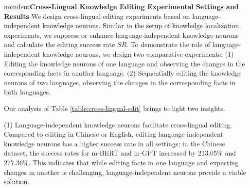 \documentclass[]{article}
\newcommand{\vpara}[1]{noindent\textbf{#1 }}%
\begin{document}
\vpara{Cross-Lingual Knowledge Editing Experimental Settings and Results}
We design cross-lingual editing experiments based on language-independent knowledge neurons. Similar to the setup of knowledge localization experiments, we suppress or enhance language-independent knowledge neurons and calculate the editing success rate \( SR \). To demonstrate the role of language-independent knowledge neurons, we design two comparative experiments:
(1) Editing the knowledge neurons of one language and observing the changes in the corresponding facts in another language.
(2) Sequentially editing the knowledge neurons of two languages, observing the changes in the corresponding facts in both languages.

Our analysis of Table \ref{table:cross-lingual-edit} brings to light two insights.

(1) Language-independent knowledge neurons facilitate cross-lingual editing. Compared to editing in Chinese or English, editing language-independent knowledge neurons has a higher success rate in all settings; in the Chinese dataset, the success rates for m-BERT and m-GPT increased by 213.05\% and 277.36\%. This indicates that while editing facts in one language and expecting changes in another is challenging, language-independent neurons provide a viable solution.
\end{document}
